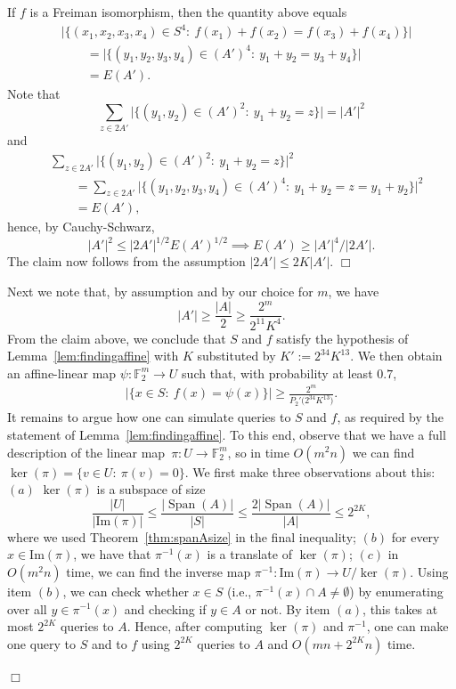 \documentclass[11pt]{amsart}
\newcommand{\F}{\mathbb{F}} %
\DeclareMathOperator{\vspan}{Span} %
\theoremstyle{plain}
\theoremstyle{definition}
\theoremstyle{remark}
\renewenvironment{proof}[1][]{
    	\begin{trivlist}
     	\item[\hspace{\labelsep}{\em\noindent Proof#1:\/}]}
     	{{\hfill$\Box$}
    	\end{trivlist}
  }
\begin{document}
\begin{proof}
\begin{proof}
If $f$ is a Freiman isomorphism, then the quantity above equals
\begin{align*}
    &\big|\big\{(x_1, x_2, x_3, x_4)\in S^4:\: f(x_1)+ f(x_2) = f(x_3)+f(x_4)\big\}\big| \\
    &\qquad = \big|\big\{(y_1, y_2, y_3, y_4)\in (A')^4:\: y_1+y_2 = y_3+y_4\big\}\big| \\
    &\qquad = E(A').
\end{align*}
Note that
$$\sum_{z\in 2A'} \big|\big\{(y_1, y_2)\in (A')^2:\: y_1+y_2 = z\big\}\big| = |A'|^2$$
and
\begin{align*}
    &\sum_{z\in 2A'} \big|\big\{(y_1, y_2)\in (A')^2:\: y_1+y_2 = z\big\}\big|^2 \\
    &\qquad = \sum_{z\in 2A'} \big|\big\{(y_1, y_2, y_3, y_4)\in (A')^4:\: y_1+y_2 = z = y_1+y_2\big\}\big|^2 \\
    &\qquad = E(A'),
\end{align*}
hence, by Cauchy-Schwarz,
$$|A'|^2 \leq |2A'|^{1/2} E(A')^{1/2} \implies E(A') \geq |A'|^4/|2A'|.$$
The claim now follows from the assumption $|2A'| \leq 2K |A'|$.
\end{proof}

Next we note that, by assumption and by our choice for $m$, we have
$$|A'| \geq \frac{|A|}{2} \geq \frac{2^m}{2^{11}K^4}.$$
From the claim above, we conclude that $S$ and $f$ satisfy the hypothesis of Lemma~\ref{lem:findingaffine} with $K$ substituted by $K' := 2^{34}K^{13}$.
We then obtain an affine-linear map $\psi: \F_2^m \to U$ such that, with probability at least $0.7$,
\begin{align}
    \label{eq:promiseofpsi=phi}
    \big|\big\{x\in S:\: f(x) = \psi(x)\big\}\big| \geq \frac{2^m}{P_2'\big(2^{34}K^{13}\big)}.
\end{align}
It remains to argue how one can simulate queries to $S$ and $f$, as required by the statement of Lemma~\ref{lem:findingaffine}.
To this end, observe that we have a full description of the linear map~$\pi: U\to \F_2^m$, so in time $O(m^2 n)$ we can find $\ker(\pi)= \{v\in U:\: \pi(v)=0\}$.
We first make three observations about this:
$(a)$ $\ker(\pi)$ is a subspace of size
$$\frac{|U|}{|\mathrm{Im}(\pi)|} \leq \frac{|\vspan(A)|}{|S|} \leq \frac{2|\vspan(A)|}{|A|} \leq 2^{2K},$$
where we used Theorem~\ref{thm:spanAsize} in the final inequality;
$(b)$ for every $x\in \mathrm{Im}(\pi)$, we have that $\pi^{-1}(x)$ is a translate of $\ker(\pi)$;
$(c)$ in $O(m^2 n)$ time, we can find the inverse map $\pi^{-1}: \mathrm{Im}(\pi) \to U/\ker(\pi)$.
Using item $(b)$, we can check whether $x\in S$ (i.e., $\pi^{-1}(x) \cap A \neq \emptyset$) by enumerating over all $y\in \pi^{-1}(x)$ and checking if $y\in A$ or not.
By item $(a)$, this takes at most $2^{2K}$ queries to $A$.
Hence, after computing $\ker(\pi)$ and $\pi^{-1}$, one can make one query to $S$ and to $f$ using $2^{2K}$ queries to $A$ and $O(mn + 2^{2K}n)$ time.


\end{proof}
\end{document}
